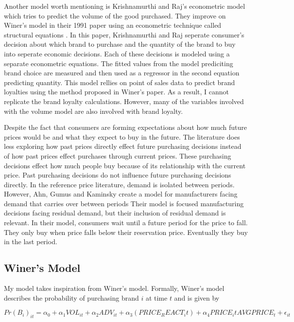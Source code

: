 \documentclass{article}
\begin{document}
Another model worth mentioning is Krishnamurthi and Raj's econometric model which tries to predict the volume of the good purchased. They improve on Winer's model in their 1991 paper using an econometric technique called structural equations \cite{krishnamurthi}.  In this paper, Krishnamurthi and Raj seperate consumer's decision about which brand to purchase and the quantity of the brand to buy into seperate economic decisions. Each of these decisions is modeled using a separate econometric equations. The fitted values from the model prediciting brand choice are measured and then used as a regressor in the second equation predicting quantity. This model rellies on point of sales data to predict brand loyalties using the method proposed in Winer's paper. As a result, I cannot replicate the brand loyalty calculations. However, many of the variables involved with the volume model are also involved with brand loyalty.


Despite the fact that consumers are forming expectations about how much future prices would be and what they expect to buy in the future.  The literature does less exploring how past prices directly effect future purchasing decisions instead of how past prices effect purchases through current prices. These purchasing decisions effect how much people buy because of its relationship with the current price. Past purchasing decisions do not influence future purchasing decisions directly.  In the reference price literature, demand is isolated between periods. However, Ahn, Gumus and Kaminsky create a model for manufacturers facing demand that carries over between periods \cite{ahn} Their model is focused manufacturing decisions facing residual demand, but their inclusion of residual demand is relevant. In their model, consumers wait until a future period for the price to fall. They only buy when price falls below their reservation price. Eventually they buy in the last period.



\subsection{Winer's Model}
My model takes inspiration from Winer's model. Formally, Winer's model describes the probability of purchasing brand $i$ at time $t$ and is given by

$$ {Pr(B_i)}_{it} = \alpha_0 + \alpha_1 {VOL}_{it} + \alpha_2 {ADV}_{it} +  \alpha_3 (PRICE_REACT_it)+ \alpha_4 {PRICE_it}{AVGPRICE_{t}} + \epsilon_{it}$$
\end{document}
